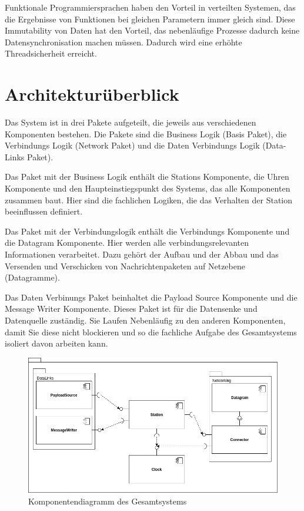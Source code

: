 \documentclass[draft=false
              ,paper=a4
              ,twoside=false
              ,fontsize=11pt
              ,headsepline
              ,BCOR10mm
              ,DIV11
              ]{scrbook}
\begin{document}
Funktionale Programmiersprachen haben den Vorteil in verteilten Systemen, das die Ergebnisse von Funktionen bei gleichen Parametern immer gleich sind. Diese Immutability von Daten hat den Vorteil, das nebenläufige Prozesse dadurch keine Datensynchronisation machen müssen. Dadurch wird eine erhöhte Threadsicherheit erreicht.

\section{Architekturüberblick}
Das System ist in drei Pakete aufgeteilt, die jeweils aus verschiedenen Komponenten bestehen.
Die Pakete sind die Business Logik (Basis Paket), die Verbindungs Logik (Network Paket) und die Daten Verbindungs Logik (Data-Links Paket).

Das Paket mit der Business Logik enthält die Stations Komponente, die Uhren Komponente und den Haupteinstiegspunkt des Systems, das alle Komponenten zusammen baut. Hier sind die fachlichen Logiken, die das Verhalten der Station beeinflussen definiert.

Das Paket mit der Verbindungslogik enthält die Verbindungs Komponente und die Datagram Komponente. Hier werden alle verbindungsrelevanten Informationen verarbeitet. Dazu gehört der Aufbau und der Abbau und das Versenden und Verschicken von Nachrichtenpaketen auf Netzebene (Datagramme).

Das Daten Verbinungs Paket beinhaltet die Payload Source Komponente und die Message Writer Komponente. Dieses Paket ist für die Datensenke und Datenquelle zuständig. Sie Laufen Nebenläufig zu den anderen Komponenten, damit Sie diese nicht blockieren und so die fachliche Aufgabe des Gesamtsystems isoliert davon arbeiten kann.

\begin{figure}[h]
\centering
\includegraphics[width=\textwidth]{component-diagram.png}
\caption[component-diagram]{Komponentendiagramm des Gesamtsystems}
\label{fig:component-diagram}
\end{figure}
\end{document}
